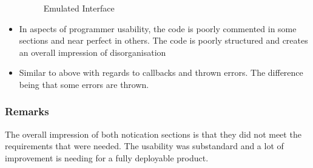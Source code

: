 \begin{itemize}
\begin{figure}[h!]
		\caption{Emulated Interface}
		\label{fig:emuInterface}
	\end{figure}
	\item In aspects of programmer usability, the code is poorly commented in some sections and near perfect in others. The code is poorly structured and creates an overall impression of disorganisation
	\item Similar to above with regards to callbacks and thrown errors. The difference being that some errors are thrown. 
\end{itemize}
\subsubsection{Remarks}
The overall impression of both notication sections is that they did not meet the requirements that were needed. The usability was substandard and a lot of improvement is needing for a fully deployable product.
